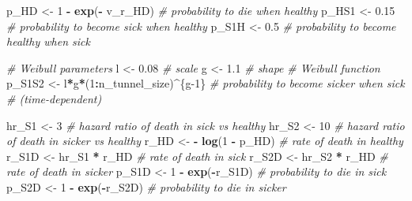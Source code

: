 \documentclass[
]{article}
\newenvironment{Shaded}{\begin{snugshade}}{\end{snugshade}}
\newcommand{\CommentTok}[1]{\textcolor[rgb]{0.56,0.35,0.01}{\textit{#1}}}
\newcommand{\DecValTok}[1]{\textcolor[rgb]{0.00,0.00,0.81}{#1}}
\newcommand{\FloatTok}[1]{\textcolor[rgb]{0.00,0.00,0.81}{#1}}
\newcommand{\KeywordTok}[1]{\textcolor[rgb]{0.13,0.29,0.53}{\textbf{#1}}}
\newcommand{\NormalTok}[1]{#1}
\newcommand{\OperatorTok}[1]{\textcolor[rgb]{0.81,0.36,0.00}{\textbf{#1}}}
\newcommand{\StringTok}[1]{\textcolor[rgb]{0.31,0.60,0.02}{#1}}
\begin{document}
\begin{Shaded}
\begin{Highlighting}[]
{{{\NormalTok{p_HD    <-}\StringTok{ }\DecValTok{1} \OperatorTok{-}\StringTok{ }\KeywordTok{exp}\NormalTok{(}\OperatorTok{-}\StringTok{ }\NormalTok{v_r_HD)         }\CommentTok{# probability to die when healthy}
\NormalTok{p_HS1   <-}\StringTok{ }\FloatTok{0.15}                        \CommentTok{# probability to become sick when healthy}
\NormalTok{p_S1H   <-}\StringTok{ }\FloatTok{0.5}                         \CommentTok{# probability to become healthy when sick}

\CommentTok{# Weibull parameters}
\NormalTok{l       <-}\StringTok{ }\FloatTok{0.08} \CommentTok{# scale}
\NormalTok{g       <-}\StringTok{ }\FloatTok{1.1}  \CommentTok{# shape}
\CommentTok{# Weibull function}
\NormalTok{p_S1S2  <-}\StringTok{ }\NormalTok{l}\OperatorTok{*}\NormalTok{g}\OperatorTok{*}\NormalTok{(}\DecValTok{1}\OperatorTok{:}\NormalTok{n_tunnel_size)}\OperatorTok{^}\NormalTok{\{g}\DecValTok{-1}\NormalTok{\} }\CommentTok{# probability to become sicker when sick }
                                       \CommentTok{# (time-dependent)}

\NormalTok{hr_S1   <-}\StringTok{ }\DecValTok{3}                           \CommentTok{# hazard ratio of death in sick vs healthy}
\NormalTok{hr_S2   <-}\StringTok{ }\DecValTok{10}                          \CommentTok{# hazard ratio of death in sicker vs healthy }
\NormalTok{r_HD    <-}\StringTok{ }\OperatorTok{-}\StringTok{ }\KeywordTok{log}\NormalTok{(}\DecValTok{1} \OperatorTok{-}\StringTok{ }\NormalTok{p_HD)           }\CommentTok{# rate of death in healthy}
\NormalTok{r_S1D   <-}\StringTok{ }\NormalTok{hr_S1 }\OperatorTok{*}\StringTok{ }\NormalTok{r_HD                }\CommentTok{# rate of death in sick}
\NormalTok{r_S2D   <-}\StringTok{ }\NormalTok{hr_S2 }\OperatorTok{*}\StringTok{ }\NormalTok{r_HD                }\CommentTok{# rate of death in sicker}
\NormalTok{p_S1D   <-}\StringTok{ }\DecValTok{1} \OperatorTok{-}\StringTok{ }\KeywordTok{exp}\NormalTok{(}\OperatorTok{-}\NormalTok{r_S1D)           }\CommentTok{# probability to die in sick}
\NormalTok{p_S2D   <-}\StringTok{ }\DecValTok{1} \OperatorTok{-}\StringTok{ }\KeywordTok{exp}\NormalTok{(}\OperatorTok{-}\NormalTok{r_S2D)           }\CommentTok{# probability to die in sicker}

}}}
\end{Highlighting}
\end{Shaded}
\end{document}
